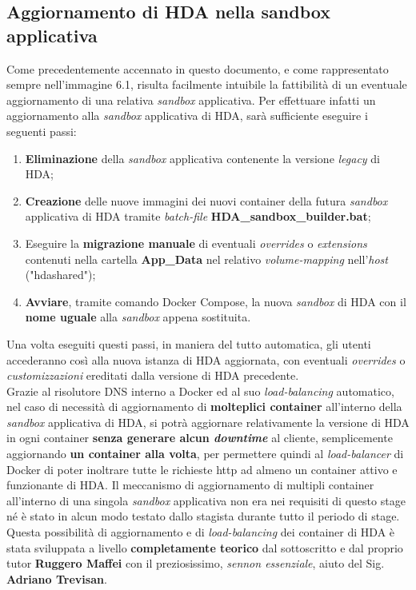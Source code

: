 \subsection{Aggiornamento di HDA nella sandbox applicativa}
Come precedentemente accennato in questo documento, e come rappresentato sempre nell'immagine 6.1, risulta facilmente intuibile la fattibilità di un eventuale aggiornamento di una relativa \textit{sandbox} applicativa. Per effettuare infatti un aggiornamento alla \textit{sandbox} applicativa di HDA, sarà sufficiente eseguire i seguenti passi:
\begin{enumerate}
	\item \textbf{Eliminazione} della \textit{sandbox} applicativa contenente la versione \textit{legacy} di HDA;
	\item \textbf{Creazione} delle nuove immagini dei nuovi container della futura \textit{sandbox} applicativa di HDA tramite \textit{batch-file} \textbf{HDA\_sandbox\_builder.bat};
	\item Eseguire la \textbf{migrazione manuale} di eventuali \textit{overrides} o \textit{extensions} contenuti nella cartella \textbf{App\_Data} nel relativo \textit{volume-mapping} nell'\textit{host} ("hdashared");
	\item \textbf{Avviare}, tramite comando Docker Compose, la nuova \textit{sandbox} di HDA con il \textbf{nome uguale} alla \textit{sandbox} appena sostituita.
\end{enumerate}

Una volta eseguiti questi passi, in maniera del tutto automatica, gli utenti accederanno così alla nuova istanza di HDA aggiornata, con eventuali \textit{overrides} o \textit{customizzazioni} ereditati dalla versione di HDA precedente.\\

Grazie al risolutore DNS interno a Docker ed al suo \textit{load-balancing} automatico, nel caso di necessità di aggiornamento di \textbf{molteplici container} all'interno della \textit{sandbox} applicativa di HDA, si potrà aggiornare relativamente la versione di HDA in ogni container \textbf{senza generare alcun \textit{downtime}} al cliente, semplicemente aggiornando \textbf{un container alla volta}, per permettere quindi al \textit{load-balancer} di Docker di poter inoltrare tutte le richieste http ad almeno un container attivo e funzionante di HDA. Il meccanismo di aggiornamento di multipli container all'interno di una singola \textit{sandbox} applicativa non era nei requisiti di questo stage né è stato in alcun modo testato dallo stagista durante tutto il periodo di stage. Questa possibilità di aggiornamento e di \textit{load-balancing} dei container di HDA è stata sviluppata a livello \textbf{completamente teorico} dal sottoscritto e dal proprio tutor \textbf{Ruggero Maffei} con il preziosissimo, \textit{sennon essenziale}, aiuto del Sig. \textbf{Adriano Trevisan}.

